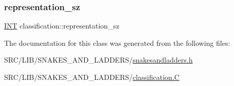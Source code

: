 \subsubsection{\texorpdfstring{representation\+\_\+sz}{representation\_sz}}
{\footnotesize\ttfamily \mbox{\hyperlink{galois_8h_a09fddde158a3a20bd2dcadb609de11dc}{I\+NT}} classification\+::representation\+\_\+sz}



The documentation for this class was generated from the following files\+:\begin{DoxyCompactItemize}
\item 
S\+R\+C/\+L\+I\+B/\+S\+N\+A\+K\+E\+S\+\_\+\+A\+N\+D\+\_\+\+L\+A\+D\+D\+E\+R\+S/\mbox{\hyperlink{snakesandladders_8h}{snakesandladders.\+h}}\item 
S\+R\+C/\+L\+I\+B/\+S\+N\+A\+K\+E\+S\+\_\+\+A\+N\+D\+\_\+\+L\+A\+D\+D\+E\+R\+S/\mbox{\hyperlink{classification_8_c}{classification.\+C}}\end{DoxyCompactItemize}
